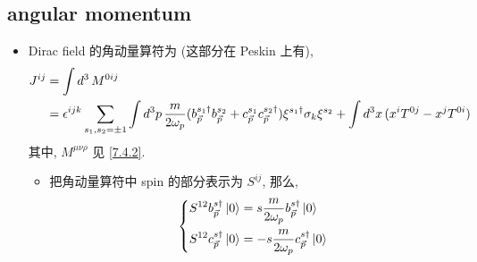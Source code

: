 \subsection{angular momentum}
\begin{itemize}
	\item Dirac field 的角动量算符为 (这部分在 Peskin 上有),
	\begin{align}
		J^{i j} &= \int d^3 \, M^{0 i j} \notag \\
		&= \epsilon^{i j k} \sum_{s_1, s_2 = \pm 1} \int d^3 p \, \frac{m}{2 \omega_p} (b^{s_1 \dag}_{\vec{p}} b^{s_2}_{\vec{p}} + c^{s_1}_{\vec{p}} c^{s_2 \dag}_{\vec{p}}) \xi^{s_1 \dag} \sigma_k \xi^{s_2} + \int d^3 x \, (x^i T^{0 j} - x^j T^{0 i})
	\end{align}
	其中, $M^{\mu \nu \rho}$ 见 \eqref{7.4.2}.
	\begin{itemize}
		\item 把角动量算符中 spin 的部分表示为 $S^{i j}$, 那么,
		\begin{equation}
			\begin{dcases}
				S^{1 2} b^{s \dag}_{\vec{p}} \ket{0} = s \frac{m}{2 \omega_p} b^{s \dag}_{\vec{p}} \ket{0} \\
				S^{1 2} c^{s \dag}_{\vec{p}} \ket{0} = - s \frac{m}{2 \omega_p} c^{s \dag}_{\vec{p}} \ket{0}
			\end{dcases}
		\end{equation}
	\end{itemize}
	

\end{itemize}
